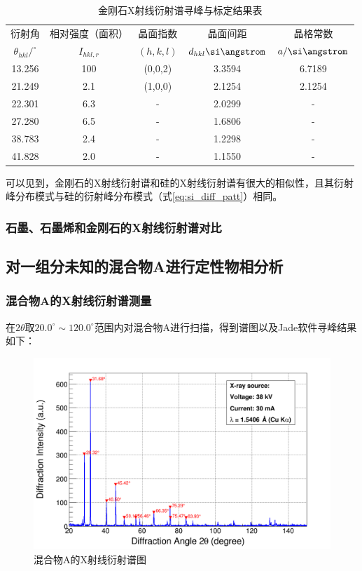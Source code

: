 \documentclass{thuemp}
\begin{document}
\begin{table}
    \centering
    \captionnamefont{\wuhao\bf\heiti}
    \captiontitlefont{\wuhao\bf\heiti}
    \caption{金刚石X射线衍射谱寻峰与标定结果表}
    \label{tab:diamond_xrd}
    \liuhao
    \begin{tabular}{ccccc}
        \toprule
        衍射角 & 相对强度（面积）& 晶面指数 & 晶面间距 & 晶格常数 \\
        $\theta_{hkl}/^\circ$ & $I_{hkl,r}$ & $(h,k,l)$ & $d_{hkl}\text{\si\angstrom}$ & $a/\text{\si\angstrom}$\\
        \midrule
        13.256 & 100 & (0,0,2) & 3.3594 & 6.7189 \\
        21.249 & 2.1 & (1,0,0) & 2.1254 & 2.1254 \\
        22.301 & 6.3 &    -    & 2.0299 &   -    \\
        27.280 & 6.5 &    -    & 1.6806 &   -    \\
        38.783 & 2.4 &    -    & 1.2298 &   -    \\
        41.828 & 2.0 &    -    & 1.1550 &   -    \\
        \bottomrule
    \end{tabular}
\end{table}

可以见到，金刚石的X射线衍射谱和硅的X射线衍射谱有很大的相似性，且其衍射峰分布模式与硅的衍射峰分布模式（式\ref{eq:si_diff_patt}）相同。

\subsubsection{石墨、石墨烯和金刚石的X射线衍射谱对比}



\subsection{对一组分未知的混合物A进行定性物相分析}

\subsubsection{混合物A的X射线衍射谱测量}

在$2\theta$取$20.0^\circ \sim 120.0^\circ$范围内对混合物A进行扫描，得到谱图以及Jade软件寻峰结果如下：

\begin{figure}[H]
    \centering
    \includegraphics[width=0.8\linewidth]{../Data/Mixture.png}
    \caption{混合物A的X射线衍射谱图}
    \label{fig:mixture_a_xrd}
\end{figure}
\end{document}
